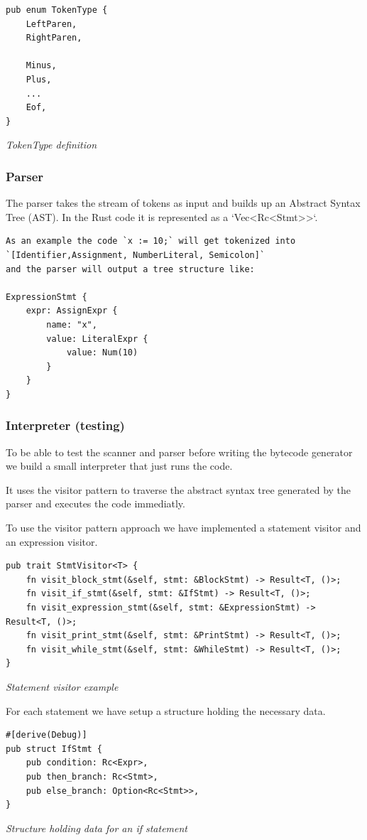 \documentclass{article}
\begin{document}
\begin{verbatim}
pub enum TokenType {
    LeftParen,
    RightParen,

    Minus,
    Plus,
    ...
    Eof,
}
\end{verbatim}
\textit{TokenType definition}

\subsubsection{Parser}
The parser takes the stream of tokens as input and builds up an Abstract Syntax
Tree (AST). In the Rust code it is represented as a `Vec<Rc<Stmt>>`.

\begin{verbatim}
As an example the code `x := 10;` will get tokenized into 
`[Identifier,Assignment, NumberLiteral, Semicolon]` 
and the parser will output a tree structure like:

ExpressionStmt {
    expr: AssignExpr {
        name: "x",
        value: LiteralExpr {
            value: Num(10)
        }
    }
}
\end{verbatim}

\subsubsection{Interpreter (testing)}
To be able to test the scanner and parser before writing the bytecode generator
we build a small interpreter that just runs the code.

It uses the visitor pattern to traverse the abstract syntax tree generated by
the parser and executes the code immediatly.

To use the visitor pattern approach we have implemented a statement visitor and
an expression visitor.

\begin{verbatim}
pub trait StmtVisitor<T> {
    fn visit_block_stmt(&self, stmt: &BlockStmt) -> Result<T, ()>;
    fn visit_if_stmt(&self, stmt: &IfStmt) -> Result<T, ()>;
    fn visit_expression_stmt(&self, stmt: &ExpressionStmt) -> Result<T, ()>;
    fn visit_print_stmt(&self, stmt: &PrintStmt) -> Result<T, ()>;
    fn visit_while_stmt(&self, stmt: &WhileStmt) -> Result<T, ()>;
}
\end{verbatim}
\textit{Statement visitor example}

For each statement we have setup a structure holding the necessary data.

\begin{verbatim}
#[derive(Debug)]
pub struct IfStmt {
    pub condition: Rc<Expr>,
    pub then_branch: Rc<Stmt>,
    pub else_branch: Option<Rc<Stmt>>,
}
\end{verbatim}
\textit{Structure holding data for an if statement}
\end{document}
